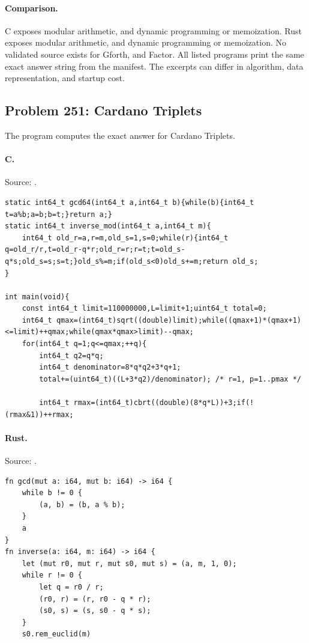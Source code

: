 \paragraph{Comparison.}
C exposes modular arithmetic, and dynamic programming or memoization. Rust exposes modular arithmetic, and dynamic programming or memoization.
No validated source exists for Gforth, and Factor.
All listed programs print the same exact answer string from the manifest. The excerpts can differ in algorithm, data representation, and startup cost.

\subsection{Problem 251: Cardano Triplets}
\label{walkthrough:p251}
The program computes the exact answer for Cardano Triplets.

\paragraph{C.} Source: .
\begin{lstlisting}
static int64_t gcd64(int64_t a,int64_t b){while(b){int64_t t=a%b;a=b;b=t;}return a;}
static int64_t inverse_mod(int64_t a,int64_t m){
    int64_t old_r=a,r=m,old_s=1,s=0;while(r){int64_t q=old_r/r,t=old_r-q*r;old_r=r;r=t;t=old_s-q*s;old_s=s;s=t;}old_s%=m;if(old_s<0)old_s+=m;return old_s;
}

int main(void){
    const int64_t limit=110000000,L=limit+1;uint64_t total=0;
    int64_t qmax=(int64_t)sqrt((double)limit);while((qmax+1)*(qmax+1)<=limit)++qmax;while(qmax*qmax>limit)--qmax;
    for(int64_t q=1;q<=qmax;++q){
        int64_t q2=q*q;
        int64_t denominator=8*q*q2+3*q+1;
        total+=(uint64_t)((L+3*q2)/denominator); /* r=1, p=1..pmax */

        int64_t rmax=(int64_t)cbrt((double)(8*q*L))+3;if(!(rmax&1))++rmax;
\end{lstlisting}

\paragraph{Rust.} Source: .
\begin{lstlisting}
fn gcd(mut a: i64, mut b: i64) -> i64 {
    while b != 0 {
        (a, b) = (b, a % b);
    }
    a
}
fn inverse(a: i64, m: i64) -> i64 {
    let (mut r0, mut r, mut s0, mut s) = (a, m, 1, 0);
    while r != 0 {
        let q = r0 / r;
        (r0, r) = (r, r0 - q * r);
        (s0, s) = (s, s0 - q * s);
    }
    s0.rem_euclid(m)
\end{lstlisting}

